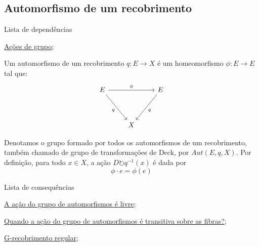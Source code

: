 \subsection{Automorfismo de um recobrimento}
\label{automorfismo-de-recobrimento-def}
\begin{titlemize}{Lista de dependências}
	\item \hyperref[ações-de-grupo-def]{Ações de grupo};
\end{titlemize}
\begin{defi}
    Um automorfismo de um recobrimento $q:E \longrightarrow X$ é um homeomorfismo $\phi:E \longrightarrow E$ tal que:
    \[\begin{tikzcd}
	E && E \\
	\\
	& X
	\arrow["\phi", from=1-1, to=1-3]
	\arrow["q"', from=1-1, to=3-2]
	\arrow["q", from=1-3, to=3-2]
    \end{tikzcd}\]
\end{defi}

Denotamos o grupo formado por todos os automorfismos de um recobrimento, também chamado de grupo de transformações de Deck, por $Aut(E, q, X)$. Por definição, para todo $x \in X$, a ação $D \circlearrowright q^{-1}(x)$ é dada por $$\phi \cdot e = \phi(e)$$

\begin{titlemize}{Lista de consequências}
	\item \hyperref[acao-de-automorfismos-e-livre-prop]{A ação do grupo de automorfismos é livre};\\
    \item \hyperref[acao-de-automorfismo-transitiva-prop]{Quando a ação do grupo de automorfismos é transitiva sobre as fibras?};\\
    \item \hyperref[g-recobrimento-regular-def]{G-recobrimento regular};
\end{titlemize}